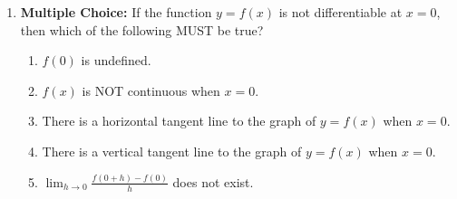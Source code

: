 \documentclass[12pt]{article}
\begin{document}
\begin{enumerate}
\begin{enumerate}
\end{enumerate}

\item {\bf Multiple Choice:} If the function $y=f(x)$ is not differentiable at $x=0$, then which of the following MUST be true?

\begin{enumerate}

\item $f(0)$ is undefined.

\item $f(x)$ is NOT continuous when $x=0$.

\item There is a horizontal tangent line to the graph of $y=f(x)$ when $x=0$.

\item There is a vertical tangent line to the graph of $y=f(x)$ when $x=0$.

\item $\lim_{h\rightarrow 0}\frac{f(0+h)-f(0)}{h}$ does not exist.

\end{enumerate}

\newpage


\end{enumerate}
\end{document}
